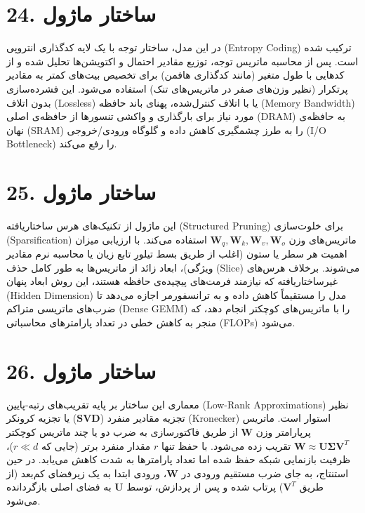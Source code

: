 \documentclass[12pt,a4paper]{report}
\begin{document}
\section*{24. ساختار ماژول }
در این مدل، ساختار توجه با یک لایه کدگذاری انتروپی (Entropy Coding) ترکیب شده است. پس از محاسبه ماتریس توجه، توزیع مقادیر احتمال و اکتویشن‌ها تحلیل شده و از کدهایی با طول متغیر (مانند کدگذاری هافمن) برای تخصیص بیت‌های کمتر به مقادیر پرتکرار (نظیر وزن‌های صفر در ماتریس‌های تنک) استفاده می‌شود. این فشرده‌سازی بدون اتلاف (Lossless) یا با اتلاف کنترل‌شده، پهنای باند حافظه (Memory Bandwidth) مورد نیاز برای بارگذاری و واکشی تنسورها از حافظه‌ی اصلی (DRAM) به حافظه‌ی نهان (SRAM) را به طرز چشمگیری کاهش داده و گلوگاه ورودی/خروجی (I/O Bottleneck) را رفع می‌کند.

\section*{25. ساختار ماژول }
این ماژول از تکنیک‌های هرس ساختاریافته (Structured Pruning) برای خلوت‌سازی (Sparsification) ماتریس‌های وزن $\mathbf{W}_q, \mathbf{W}_k, \mathbf{W}_v, \mathbf{W}_o$ استفاده می‌کند. با ارزیابی میزان اهمیت هر سطر یا ستون (اغلب از طریق بسط تیلورِ تابع زیان یا محاسبه نرم مقادیر ویژگی)، ابعاد زائد از ماتریس‌ها به طور کامل حذف (Slice) می‌شوند. برخلاف هرس‌های غیرساختاریافته که نیازمند فرمت‌های پیچیده‌ی حافظه هستند، این روش ابعاد پنهان (Hidden Dimension) مدل را مستقیماً کاهش داده و به ترانسفورمر اجازه می‌دهد تا ضرب‌های ماتریسی متراکم (Dense GEMM) را با ماتریس‌های کوچکتر انجام دهد، که منجر به کاهش خطی در تعداد پارامترهای محاسباتی (FLOPs) می‌شود.

\section*{26. ساختار ماژول }
معماری این ساختار بر پایه تقریب‌های رتبه-پایین (Low-Rank Approximations) نظیر تجزیه مقادیر منفرد ($\mathbf{SVD}$) یا تجزیه کرونکر (Kronecker) استوار است. ماتریس پرپارامتر وزن $\mathbf{W}$ از طریق فاکتورسازی به ضرب دو یا چند ماتریس کوچکتر $\mathbf{W} \approx \mathbf{U} \mathbf{\Sigma} \mathbf{V}^T$ تقریب زده می‌شود. با حفظ تنها $r$ مقدار منفرد برتر (جایی که $r \ll d$)، ظرفیت بازنمایی شبکه حفظ شده اما تعداد پارامترها به شدت کاهش می‌یابد. در حین استنتاج، به جای ضرب مستقیم ورودی در $\mathbf{W}$، ورودی ابتدا به یک زیرفضای کم‌بعد (از طریق $\mathbf{V}^T$) پرتاب شده و پس از پردازش، توسط $\mathbf{U}$ به فضای اصلی بازگردانده می‌شود.
\end{document}
